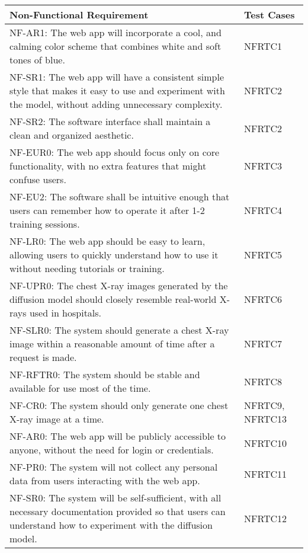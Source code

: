 \documentclass[12pt, titlepage]{article}
\begin{document}
\begin{table}[h]
  \centering
  \begin{tabular}{|p{}|p{}|}
    \hline
    \textbf{Non-Functional Requirement} & \textbf{Test Cases} \\ \hline
    NF-AR1: The web app will incorporate a cool, and calming color scheme that combines white and soft tones of blue. & NFRTC1 \\ \hline
    NF-SR1: The web app will have a consistent simple style that makes it easy to use and experiment with the model, without adding unnecessary complexity. & NFRTC2 \\ \hline
    NF-SR2: The software interface shall maintain a clean and organized aesthetic. & NFRTC2 \\ \hline
    NF-EUR0: The web app should focus only on core functionality, with no extra features that might confuse users. & NFRTC3 \\ \hline
    NF-EU2: The software shall be intuitive enough that users can remember how to operate it after 1-2 training sessions. & NFRTC4 \\ \hline
    NF-LR0: The web app should be easy to learn, allowing users to quickly understand how to use it without needing tutorials or training. & NFRTC5 \\ \hline
    NF-UPR0: The chest X-ray images generated by the diffusion model should closely resemble real-world X-rays used in hospitals. & NFRTC6 \\ \hline
    NF-SLR0: The system should generate a chest X-ray image within a reasonable amount of time after a request is made. & NFRTC7 \\ \hline
    NF-RFTR0: The system should be stable and available for use most of the time. & NFRTC8 \\ \hline
    NF-CR0: The system should only generate one chest X-ray image at a time. & NFRTC9, NFRTC13 \\ \hline
    NF-AR0: The web app will be publicly accessible to anyone, without the need for login or credentials. & NFRTC10 \\ \hline
    NF-PR0: The system will not collect any personal data from users interacting with the web app. & NFRTC11 \\ \hline
    NF-SR0: The system will be self-sufficient, with all necessary documentation provided so that users can understand how to experiment with the diffusion model. & NFRTC12 \\ \hline
  \end{tabular}
\end{table}
\end{document}
